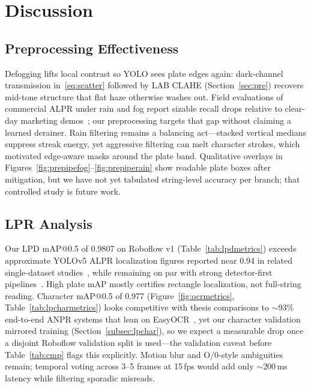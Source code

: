 \documentclass[10pt, conference]{IEEEtran}
\begin{document}
\section{Discussion}
\label{sec:disc}
\subsection{Preprocessing Effectiveness}
Defogging lifts local contrast so YOLO sees plate edges again: dark-channel transmission in~\eqref{eq:scatter} followed by LAB CLAHE (Section~\ref{sec:pre}) recovers mid-tone structure that flat haze otherwise washes out. Field evaluations of commercial ALPR under rain and fog report sizable recall drops relative to clear-day marketing demos~\cite{r05,r10}; our preprocessing targets that gap without claiming a learned derainer. Rain filtering remains a balancing act---stacked vertical medians suppress streak energy, yet aggressive filtering can melt character strokes, which motivated edge-aware masks around the plate band. Qualitative overlays in Figures~\ref{fig:prepipefog}--\ref{fig:prepiperain} show readable plate boxes after mitigation, but we have not yet tabulated string-level accuracy per branch; that controlled study is future work.

\subsection{LPR Analysis}
Our LPD mAP@0.5 of 0.9807 on Roboflow v1 (Table~\ref{tab:lpdmetrics}) exceeds approximate YOLOv5 ALPR localization figures reported near 0.94 in related single-dataset studies~\cite{r01}, while remaining on par with strong detector-first pipelines~\cite{r06}. High plate mAP mostly certifies rectangle localization, not full-string reading. Character mAP@0.5 of 0.977 (Figure~\ref{fig:ocrmetrics}, Table~\ref{tab:lpcharmetrics}) looks competitive with thesis comparisons to $\sim$93\% end-to-end ANPR systems that lean on EasyOCR~\cite{r03}, yet our character validation mirrored training (Section~\ref{subsec:lpchar}), so we expect a measurable drop once a disjoint Roboflow validation split is used---the validation caveat before Table~\ref{tab:cmp} flags this explicitly. Motion blur and O/0-style ambiguities remain; temporal voting across 3--5 frames at 15\,fps would add only $\sim$200\,ms latency while filtering sporadic misreads.
\end{document}
